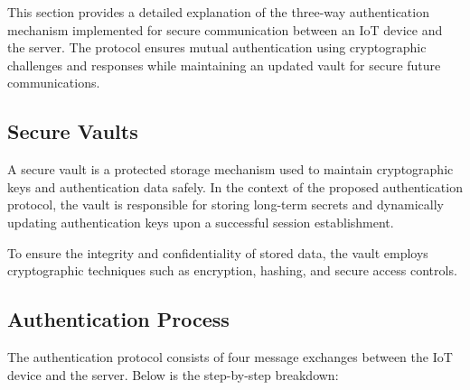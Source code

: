\documentclass[10pt,twocolumn,letterpaper]{article}
\begin{document}
This section provides a detailed explanation of the three-way authentication mechanism implemented for secure communication between an IoT device and the server. The protocol ensures mutual authentication using cryptographic challenges and responses while maintaining an updated vault for secure future communications.

\subsection{Secure Vaults}

A secure vault is a protected storage mechanism used to maintain cryptographic keys and authentication data safely. In the context of the proposed authentication protocol, the vault is responsible for storing long-term secrets and dynamically updating authentication keys upon a successful session establishment.

To ensure the integrity and confidentiality of stored data, the vault employs cryptographic techniques such as encryption, hashing, and secure access controls.

\subsection{Authentication Process}
The authentication protocol consists of four message exchanges between the IoT device and the server. Below is the step-by-step breakdown:
\end{document}
